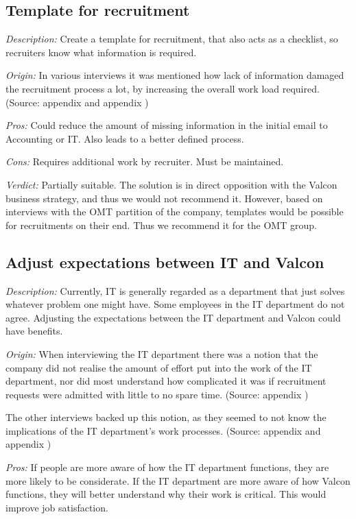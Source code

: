\subsection{Template for recruitment}
\emph{Description:} Create a template for recruitment, that also acts as a checklist, so recruiters know what information is required.

\emph{Origin:}
In various interviews it was mentioned how lack of information damaged the recruitment process a lot, by increasing the overall work load required.
(Source: appendix  and appendix )

\noindent \emph{Pros:} Could reduce the amount of missing information in the initial email to Accounting or IT. 
Also leads to a better defined process.

\noindent \emph{Cons:} Requires additional work by recruiter.
Must be maintained.

\emph{Verdict:}
Partially suitable. The solution is in direct opposition with the Valcon business strategy, and thus we would not recommend it. However, based on interviews with the OMT partition of the company, templates would be possible for recruitments on their end. Thus we recommend it for the OMT group.

\subsection{Adjust expectations between IT and Valcon}
\emph{Description:} Currently, IT is generally regarded as a department that just solves whatever problem one might have. Some employees in the IT department do not agree. Adjusting the expectations between the IT department and Valcon could have benefits.

\emph{Origin:}
When interviewing the IT department there was a notion that the company did not realise the amount of effort put into the work of the IT department, nor did most understand how complicated it was if recruitment requests were admitted with little to no spare time.
(Source: appendix )

The other interviews backed up this notion, as they seemed to not know the implications of the IT department's work processes.
(Source: appendix  and appendix )

\noindent \emph{Pros:}
If people are more aware of how the IT department functions, they are more likely to be considerate. If the IT department are more aware of how Valcon functions, they will better understand why their work is critical. This would improve job satisfaction.


